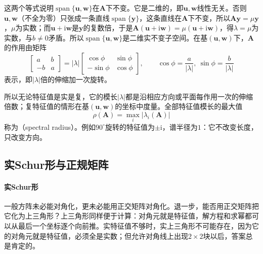 这两个等式说明$\operatorname{span}\{\bm u,\bm w\}$在$\bm A$下不变。它是二维的，即$\bm u,\bm w$线性无关。否则$\bm u,\bm w$（不全为零）只张成一条直线$\operatorname{span}\{\bm y\}$，这条直线在$\bm A$下不变，所以$\bm A\bm y=\mu\bm y$，$\mu$为实数；而$\bm u+\mathrm i\bm w$是$\bm y$的复数倍，于是$\bm A(\bm u+\mathrm i\bm w)=\mu(\bm u+\mathrm i\bm w)$，得$\lambda=\mu$为实数，与$b\neq0$矛盾。所以$\operatorname{span}\{\bm u,\bm w\}$是二维实不变子空间。在基$(\bm u,\bm w)$下，$\bm A$的作用由矩阵
\[
 \begin{bmatrix}a&b\\-b&a\end{bmatrix}
 =|\lambda|\begin{bmatrix}\cos\phi&\sin\phi\\-\sin\phi&\cos\phi\end{bmatrix},
 \qquad \cos\phi=\frac{a}{|\lambda|},\ \sin\phi=\frac{b}{|\lambda|}
\]
表示，即$|\lambda|$倍的伸缩加一次旋转。

所以无论特征值是实是复，它的模长$|\lambda|$都是沿相应方向或平面每作用一次的伸缩倍数；复特征值的情形在基$(\bm u,\bm w)$的坐标中度量。全部特征值模长的最大值
\[
 \rho(\bm A)=\max_i|\lambda_i(\bm A)|
\]
称为（spectral radius）。例如$90^\circ$旋转的特征值为$\pm\mathrm i$，谱半径为$1$：它不改变长度，只改变方向。

\subsection{实Schur形与正规矩阵}

\paragraph{实Schur形}

一般方阵未必能对角化，更未必能用正交矩阵对角化。退一步，能否用正交矩阵把它化为上三角形？上三角形同样便于计算：对角元就是特征值，解方程和求幂都可以从最后一个坐标逐个向前推。实特征值不够时，实上三角形不可能存在，因为它的对角元就是特征值，必须全是实数；但允许对角线上出现$2\times2$块以后，答案总是肯定的。

